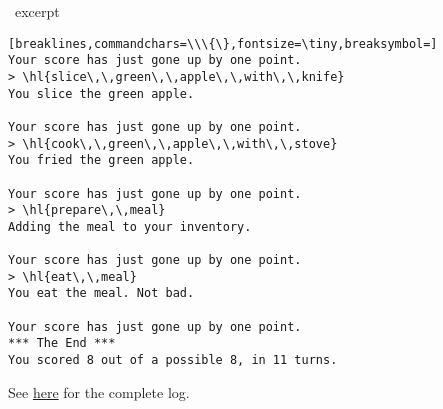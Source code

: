 \begin{AIbox}[width=0.9\textwidth]{\DV\ excerpt}
\begin{Verbatim}[breaklines,commandchars=\\\{\},fontsize=\tiny,breaksymbol=]
Your score has just gone up by one point.
> \hl{slice\,\,green\,\,apple\,\,with\,\,knife}
You slice the green apple.

Your score has just gone up by one point.
> \hl{cook\,\,green\,\,apple\,\,with\,\,stove}
You fried the green apple.

Your score has just gone up by one point.
> \hl{prepare\,\,meal}
Adding the meal to your inventory.

Your score has just gone up by one point.
> \hl{eat\,\,meal}
You eat the meal. Not bad.

Your score has just gone up by one point.
*** The End ***
You scored 8 out of a possible 8, in 11 turns.
\end{Verbatim}
\end{AIbox}

See \href{https://microsoft-my.sharepoint.com/:t:/p/yintatlee/EWfvcN7cic9NlNdBWxEs6lQBodqV54StRGjamzsLms-BiQ?e=ccijzx}{here} for the complete log.


